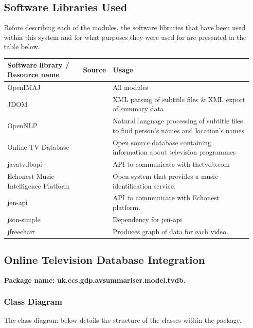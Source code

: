 \newpage
\subsection{Software Libraries Used}

Before describing each of the modules, the software libraries that have been
used within this system and for what purposes they were used for are presented
in the table below.

\begin{tabular}{|p{135pt} | p{35pt} | p{230pt} | }
\hline
Software library / Resource name & Source & Usage \\\hline
OpenIMAJ & \cite{citeOpenImaj} & All modules \\\hline
JDOM & \cite{jdom} & XML parsing of subtitle files \& XML export of summary data \\\hline
OpenNLP  & \cite{nlp} & Natural language processing of subtitle files to find person's names and location's names \\\hline
Online TV Database & \cite{tvdb} & Open source database containing information about television programmes \\\hline
javatvdbapi & \cite{tvdbLibrary}  & API to communicate with thetvdb.com \\\hline
Echonest Music Intelligence Platform & \cite{citeEcho}  & Open system that provides a music identification service. \\\hline
jen-api & \cite{jenAPI} & API to communicate with Echonest platform. \\\hline
json-simple & \cite{jsonAPI} & Dependency for jen-api \\\hline
jfreechart & \cite{JFreeChart} & Produces graph of data for each video. \\\hline
\end{tabular}
\newpage 

\subsection{Online Television Database Integration}
\label{sec:TVDB}

\textbf{Package name: uk.ecs.gdp.avsummariser.model.tvdb.}

\subsubsection{Class Diagram}
The class diagram below details the structure of the classes within the package.

